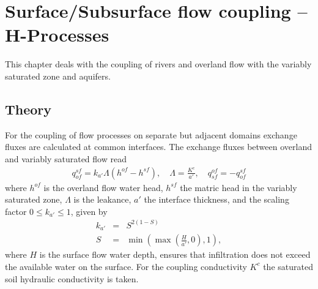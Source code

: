 \chapter{Surface/Subsurface flow coupling -- H-Processes}
\label{sec:Coupling}
%
This chapter deals with the coupling of rivers and overland flow with the variably saturated zone and aquifers.
%
\section{Theory}
\label{sec:Coupling_theory}
%
For the coupling of flow processes on separate but adjacent domains exchange fluxes are calculated at common interfaces.
The exchange fluxes between overland and variably saturated flow read
%
\begin{eqnarray}
q_{of}^{sf} = k_{a'} \Lambda \left( h^{of} - h^{sf} \right),  \quad   \Lambda = \frac{K^c}{a'} ,\quad q_{sf}^{of} = - q_{of}^{sf}
\label{eqn:CoupFlux1}
\end{eqnarray}
%
where $h^{of}$ is the overland flow water head, $h^{sf}$ the matric head in the variably saturated zone, $\Lambda$ is the leakance, $a'$ the interface thickness, and the scaling factor $0\leq k_{a'}\leq 1$, given by
%
\begin{eqnarray}
k_{a'} &=& S^{2 (1-S)} \\
S &=&  \min\left( \max\left(\frac{H}{a'},0\right),1  \right),
\end{eqnarray}
%
where $H$ is the surface flow water depth, ensures that infiltration does not exceed the available water on the surface. For the coupling conductivity $K^c$ the saturated soil hydraulic conductivity is taken.

